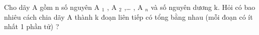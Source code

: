 Cho dãy A gồm n số nguyên A   $_    1   $   , A   $_    2   $   ,… , A   $_    n   $   và số nguyên dương k. Hỏi có bao nhiêu cách chia dãy A thành k đoạn liên tiếp có tổng bằng nhau (mỗi đoạn có ít nhất 1 phần tử) ?